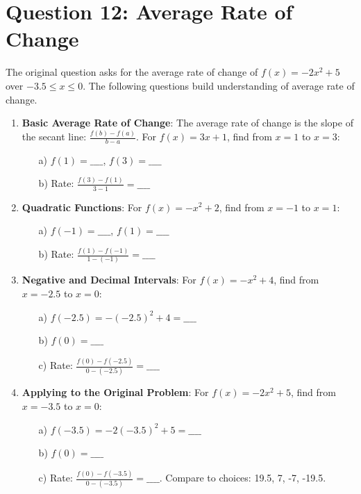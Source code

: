 \documentclass[12pt]{article}
\begin{document}
\section*{Question 12: Average Rate of Change}
The original question asks for the average rate of change of \( f(x) = -2x^2 + 5 \) over \( -3.5 \leq x \leq 0 \). The following questions build understanding of average rate of change.

\begin{enumerate}[label=12.\arabic*]
    \item \textbf{Basic Average Rate of Change}: The average rate of change is the slope of the secant line: \( \frac{f(b) - f(a)}{b - a} \). For \( f(x) = 3x + 1 \), find from \( x = 1 \) to \( x = 3 \):
    \begin{enumerate}
        \item[a)] \( f(1) = \_\_\_\_ \), \( f(3) = \_\_\_\_ \)
        \item[b)] Rate: \( \frac{f(3) - f(1)}{3 - 1} = \_\_\_\_ \)
    \end{enumerate}
    \item \textbf{Quadratic Functions}: For \( f(x) = -x^2 + 2 \), find from \( x = -1 \) to \( x = 1 \):
    \begin{enumerate}
        \item[a)] \( f(-1) = \_\_\_\_ \), \( f(1) = \_\_\_\_ \)
        \item[b)] Rate: \( \frac{f(1) - f(-1)}{1 - (-1)} = \_\_\_\_ \)
    \end{enumerate}
    \item \textbf{Negative and Decimal Intervals}: For \( f(x) = -x^2 + 4 \), find from \( x = -2.5 \) to \( x = 0 \):
    \begin{enumerate}
        \item[a)] \( f(-2.5) = -(-2.5)^2 + 4 = \_\_\_\_ \)
        \item[b)] \( f(0) = \_\_\_\_ \)
        \item[c)] Rate: \( \frac{f(0) - f(-2.5)}{0 - (-2.5)} = \_\_\_\_ \)
    \end{enumerate}
    \item \textbf{Applying to the Original Problem}: For \( f(x) = -2x^2 + 5 \), find from \( x = -3.5 \) to \( x = 0 \):
    \begin{enumerate}
        \item[a)] \( f(-3.5) = -2(-3.5)^2 + 5 = \_\_\_\_ \)
        \item[b)] \( f(0) = \_\_\_\_ \)
        \item[c)] Rate: \( \frac{f(0) - f(-3.5)}{0 - (-3.5)} = \_\_\_\_ \). Compare to choices: 19.5, 7, -7, -19.5.
    \end{enumerate}
\end{enumerate}

\end{document}
